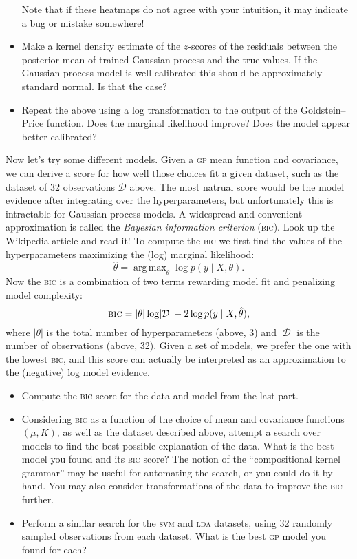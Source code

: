 \documentclass{article}
\newcommand{\acro}[1]{\textsc{\MakeLowercase{#1}}}
\newcommand{\given}{\mid}
\newcommand{\mc}[1]{\mathcal{#1}}
\newcommand{\data}{\mc{D}}
\DeclareMathOperator*{\argmax}{arg\,max}
\begin{document}
\begin{itemize}
  Note that if these heatmaps do not agree with your intuition, it may indicate
  a bug or mistake somewhere!
\item
  Make a kernel density estimate of the $z$-scores of the residuals between the
  posterior mean of trained Gaussian process and the true values. If the
  Gaussian process model is well calibrated this should be approximately
  standard normal. Is that the case?
\item
  Repeat the above using a log transformation to the output of the Goldstein--Price
  function. Does the marginal likelihood improve? Does the model appear better
  calibrated?
\end{itemize}

Now let's try some different models. Given a \acro{GP} mean function and
covariance, we can derive a score for how well those choices fit a given
dataset, such as the dataset of 32 observations $\data$ above. The most natrual
score would be the model evidence after integrating over the hyperparameters,
but unfortunately this is intractable for Gaussian process models. A widespread
and convenient approximation is called the \emph{Bayesian information criterion}
(\acro{BIC}). Look up the Wikipedia article and read it! To compute the
\acro{BIC} we first find the values of the hyperparameters maximizing the (log)
marginal likelihood:
\[
  \hat{\theta} = \argmax_\theta \log p(y \given X, \theta).
\]
Now the \acro{BIC} is a combination of two terms rewarding model fit and
penalizing model complexity:
\[
\acro{BIC} = \lvert \theta \rvert \log \lvert \data \rvert - 2 \log p(y \given X, \hat{\theta}),
\]
where $\lvert \theta \rvert$ is the total number of hyperparameters (above, 3)
and $\lvert \data \rvert$ is the number of observations (above, 32). Given a set
of models, we prefer the one with the lowest \acro{BIC}, and this score can actually
be interpreted as an approximation to the (negative) log model evidence.

\begin{itemize}
\item
  Compute the \acro{BIC} score for the data and model from the last part.
\item
  Considering \acro{BIC} as a function of the choice of mean and covariance
  functions $(\mu, K)$, as well as the dataset described above, attempt a search
  over models to find the best possible explanation of the data. What is the
  best model you found and its \acro{BIC} score? The notion of the
  ``compositional kernel grammar'' may be useful for automating the search, or
  you could do it by hand.  You may also consider transformations of the data to
  improve the \acro{BIC} further.
\item
  Perform a similar search for the \acro{SVM} and \acro{LDA} datasets, using 32
  randomly sampled observations from each dataset.  What is the best \acro{GP}
  model you found for each?
\end{itemize}
\end{document}
